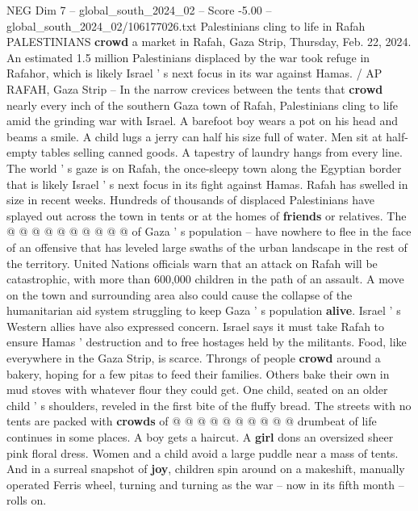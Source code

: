 \begin{textsample}{NEG Dim 7 – global\_south\_2024\_02 – Score -5.00 – global\_south\_2024\_02/106177026.txt}  \label{ex:f7_neg_396}
Palestinians cling to life in Rafah PALESTINIANS \textbf{crowd} a market in Rafah, Gaza Strip, Thursday, Feb. 22, 2024.
An estimated 1.5 million Palestinians displaced by the war took refuge in Rafahor, which is likely Israel ' s next focus in its war against Hamas. / AP RAFAH, Gaza Strip -- In the narrow crevices between the tents that \textbf{crowd} nearly every inch of the southern Gaza town of Rafah, Palestinians cling to life amid the grinding war with Israel.
A barefoot boy wears a pot on his head and beams a smile.
A child lugs a jerry can half his size full of water.
Men sit at half-empty tables selling canned goods.
A tapestry of laundry hangs from every line.
The world ' s gaze is on Rafah, the once-sleepy town along the Egyptian border that is likely Israel ' s next focus in its fight against Hamas.
Rafah has swelled in size in recent weeks.
Hundreds of thousands of displaced Palestinians have splayed out across the town in tents or at the homes of \textbf{friends} or relatives.
The @ @ @ @ @ @ @ @ @ @ of Gaza ' s population -- have nowhere to flee in the face of an offensive that has leveled large swaths of the urban landscape in the rest of the territory.
United Nations officials warn that an attack on Rafah will be catastrophic, with more than 600,000 children in the path of an assault.
A move on the town and surrounding area also could cause the collapse of the humanitarian aid system struggling to keep Gaza ' s population \textbf{alive}.
Israel ' s Western allies have also expressed concern.
Israel says it must take Rafah to ensure Hamas ' destruction and to free hostages held by the militants.
Food, like everywhere in the Gaza Strip, is scarce.
Throngs of people \textbf{crowd} around a bakery, hoping for a few pitas to feed their families.
Others bake their own in mud stoves with whatever flour they could get.
One child, seated on an older child ' s shoulders, reveled in the first bite of the fluffy bread.
The streets with no tents are packed with \textbf{crowds} of @ @ @ @ @ @ @ @ @ @ drumbeat of life continues in some places.
A boy gets a haircut.
A \textbf{girl} dons an oversized sheer pink floral dress.
Women and a child avoid a large puddle near a mass of tents.
And in a surreal snapshot of \textbf{joy}, children spin around on a makeshift, manually operated Ferris wheel, turning and turning as the war -- now in its fifth month -- rolls on.

\end{textsample}
